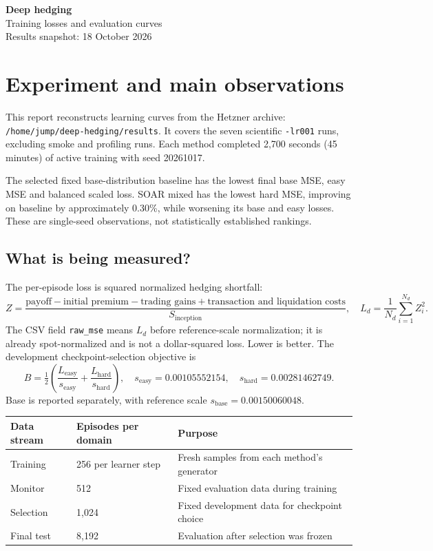 \documentclass[11pt,a4paper]{article}
\begin{document}
\begin{center}
{\LARGE\bfseries Deep hedging}\\[5pt]
{\Large Training losses and evaluation curves}\\[8pt]
Results snapshot: 18 October 2026
\end{center}

\section*{Experiment and main observations}
This report reconstructs learning curves from the Hetzner archive:\\
\texttt{/home/jump/deep-hedging/results}. It covers the seven scientific
\texttt{-lr001} runs, excluding smoke and profiling runs. Each method completed
2,700 seconds (45 minutes) of active training with seed 20261017.

The selected fixed base-distribution baseline has the lowest final base MSE,
easy MSE and balanced scaled loss. SOAR mixed has the lowest hard MSE, improving
on baseline by approximately 0.30\%, while worsening its base and easy losses.
These are single-seed observations, not statistically established rankings.

\subsection*{What is being measured?}
The per-episode loss is squared normalized hedging shortfall:
\[
 Z=\frac{\text{payoff}-\text{initial premium}-\text{trading gains}
                 +\text{transaction and liquidation costs}}{S_{\mathrm{inception}}},
 \quad L_d=\frac{1}{N_d}\sum_{i=1}^{N_d} Z_i^2.
\]
The CSV field \texttt{raw\_mse} means $L_d$ before reference-scale normalization;
it is already spot-normalized and is not a dollar-squared loss. Lower is better.
The development checkpoint-selection objective is
\[
 B=\tfrac12\left(\frac{L_{\mathrm{easy}}}{s_{\mathrm{easy}}}
                  +\frac{L_{\mathrm{hard}}}{s_{\mathrm{hard}}}\right),
 \quad s_{\mathrm{easy}}=0.00105552154,\quad
 s_{\mathrm{hard}}=0.00281462749.
\]
Base is reported separately, with reference scale $s_{\mathrm{base}}=0.00150060048$.

\begin{center}\begin{tabular}{lll}\toprule
Data stream & Episodes per domain & Purpose\\\midrule
Training & 256 per learner step & Fresh samples from each method's generator\\
Monitor & 512 & Fixed evaluation data during training\\
Selection & 1,024 & Fixed development data for checkpoint choice\\
Final test & 8,192 & Evaluation after selection was frozen\\\bottomrule
\end{tabular}\end{center}
\end{document}
